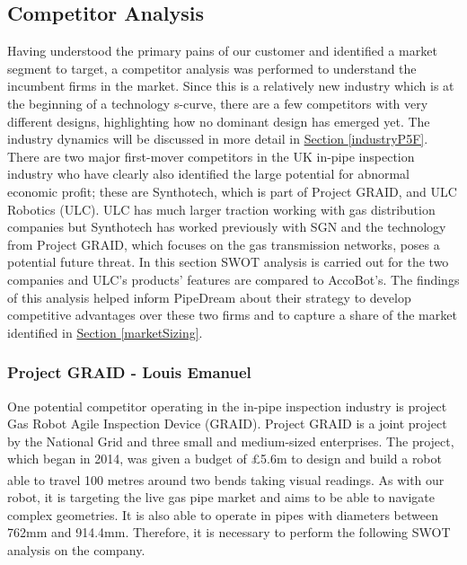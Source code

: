 \documentclass[11pt]{article}		%
\newcommand{\supercite}[1]{\textsuperscript{\cite{#1}}}		%
\newcommand{\sectref}[1]{\hyperref[#1]{Section \ref*{#1}}}     %
\begin{document}
    \subsection{Competitor Analysis} \label{competitorAnalysis}
        Having understood the primary pains of our customer and identified a market segment to target, a competitor analysis was performed to understand the incumbent firms in the market.
        Since this is a relatively new industry which is at the beginning of a technology s-curve, there are a few competitors with very different designs, highlighting how no dominant design has emerged yet. The industry dynamics will be discussed in more detail in \sectref{industryP5F}. There are two major first-mover competitors in the UK in-pipe inspection industry who have clearly also identified the large potential for abnormal economic profit; these are Synthotech, which is part of Project GRAID, and ULC Robotics (ULC). ULC has much larger traction working with gas distribution companies but Synthotech has worked previously with SGN and the technology from Project GRAID, which focuses on the gas transmission networks, poses a potential future threat. In this section SWOT analysis is carried out for the two companies and ULC's products' features are compared to AccoBot's. The findings of this analysis helped inform PipeDream about their strategy to develop competitive advantages over these two firms and to capture a share of the market identified in \sectref{marketSizing}.

		\subsubsection[Project GRAID]{Project GRAID - Louis Emanuel}
		
			One potential competitor operating in the in-pipe inspection industry is project Gas Robot Agile Inspection Device (GRAID). Project GRAID is a joint project by the National Grid and three small and medium-sized enterprises. The project, which began in 2014, was given a budget of £5.6m to design and build a robot able to travel 100 metres around two bends taking visual readings\supercite{graidy}. As with our robot, it is targeting the live gas pipe market and aims to be able to navigate complex geometries. It is also able to operate in pipes with diameters between 762mm and 914.4mm. Therefore, it is necessary to perform the following SWOT analysis on the company.
			
\end{document}
